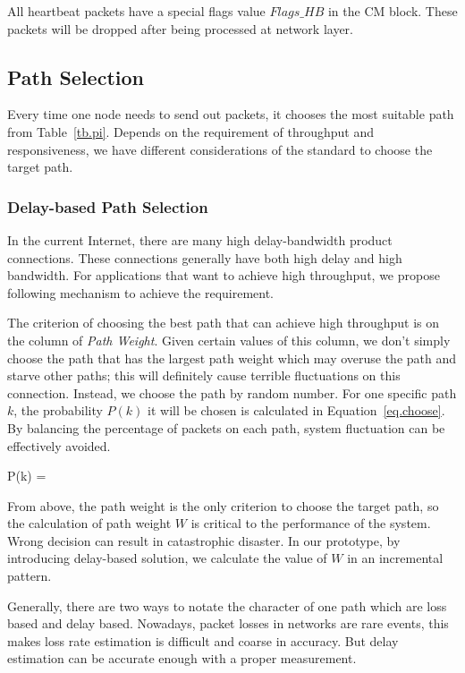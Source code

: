 All heartbeat packets have a special flags value $Flags\_HB$ in the CM block. These packets will be dropped after being processed at network layer.

\subsection{Path Selection}
\label{sec:selection}

Every time one node needs to send out packets, it chooses the most suitable path from Table~\ref{tb.pi}. Depends on the requirement of throughput and responsiveness, we have different considerations of the standard to choose the target path.

\subsubsection{Delay-based Path Selection}
\label{sec:delay}
In the current Internet, there are many high delay-bandwidth product connections. These connections generally have both high delay and high bandwidth. For applications that want to achieve high throughput, we propose following mechanism to achieve the requirement. 

The criterion of choosing the best path that can achieve high throughput is on the column of \emph{Path Weight}. Given certain values of this column, we don't simply choose the path that has the largest path weight which may overuse the path and starve other paths; this will definitely cause terrible fluctuations on this connection. Instead, we choose the path by random number. For one specific path $k$, the probability $P(k)$ it will be chosen is calculated in Equation~\ref{eq.choose}. By balancing the percentage of packets on each path, system fluctuation can be effectively avoided.

\be
\label{eq.choose}
P(k) = 
\ee

From above, the path weight is the only criterion to choose the target path, so the calculation of path weight $W$ is critical to the performance of the system. Wrong decision can result in catastrophic disaster. In our prototype, by introducing delay-based solution, we calculate the value of $W$ in an incremental pattern.

Generally, there are two ways to notate the character of one path which are loss based and delay based. Nowadays, packet losses in networks are rare events, this makes loss rate estimation is difficult and coarse in accuracy. But delay estimation can be accurate enough with a proper measurement.

